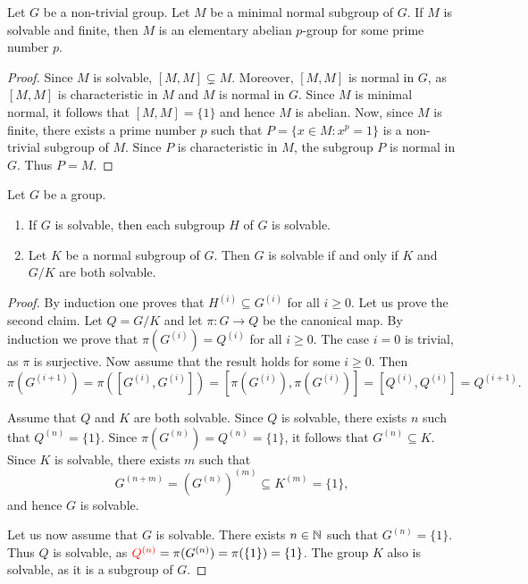 \begin{lemma}
	\label{lem:minimal_normal}
	Let $G$ be a non-trivial group.
	Let $M$ be a minimal normal subgroup of $G$. If $M$ is solvable and finite, then
	$M$ is an elementary abelian $p$-group for some prime number $p$. 
\end{lemma}

\begin{proof}
	Since $M$ is solvable, $[M,M]\subsetneq M$. Moreover, $[M,M]$ is normal in $G$, as 
    $[M,M]$ is characteristic in $M$ and $M$ is normal in $G$. Since $M$ is minimal normal, 
    it follows that $[M,M]=\{1\}$ and hence $M$ is abelian. 
	Now,  since $M$ is finite, there exists a prime number $p$ such that 
	$P=\{x\in M:x^p=1\}$ is a non-trivial subgroup of $M$.  
	Since $P$ is characteristic in $M$, the subgroup
	$P$ is normal in $G$. Thus $P=M$. 
\end{proof}



\begin{theorem}
	\label{theorem:resoluble}
	Let $G$ be a group. 
	\begin{enumerate}
		\item  If $G$ is solvable, then each subgroup $H$ of $G$ is solvable. 
		\item Let $K$ be a normal subgroup of $G$. Then $G$ is solvable
			if and only if $K$ and $G/K$ are both solvable.
	\end{enumerate}
\end{theorem}

\begin{proof}
    By induction one proves that $H^{(i)}\subseteq G^{(i)}$ for all 
    $i\geq0$. Let us prove the second claim. Let $Q=G/K$ and let $\pi\colon G\to Q$ be the canonical map. 
    By induction we prove that $\pi(G^{(i)})=Q^{(i)}$ for all 
	$i\geq0$. The case $i=0$ is trivial, as $\pi$ is surjective. Now assume that
	the result holds for some $i\geq0$. Then 
	\[
		\pi(G^{(i+1)})=\pi([G^{(i)},G^{(i)}])=[\pi(G^{(i)}),\pi(G^{(i)})]=[Q^{(i)},Q^{(i)}]=Q^{(i+1)}.
	\]

	Assume that $Q$ and $K$ are both solvable. Since $Q$ is solvable, 
	there exists $n$ such that $Q^{(n)}=\{1\}$.
	Since $\pi(G^{(n)})=Q^{(n)}=\{1\}$, it follows that $G^{(n)}\subseteq K$. Since $K$
	is solvable, there exists $m$ such that 
	\[
		G^{(n+m)}= (G^{(n)})^{(m)}\subseteq K^{(m)}=\{1\},
	\]
	and hence $G$ is solvable.  

	Let us now assume that $G$ is solvable. There exists $n\in\mathbb{N}$ such that $G^{(n)}=\{1\}$.
	Thus $Q$ is solvable, as $\textcolor{red}{Q^{(n)}}=\pi (G^{(n)})=\pi(\{1\})=\{1\}$. The group $K$ also is 
	solvable, as it is a subgroup of $G$. 
\end{proof}

